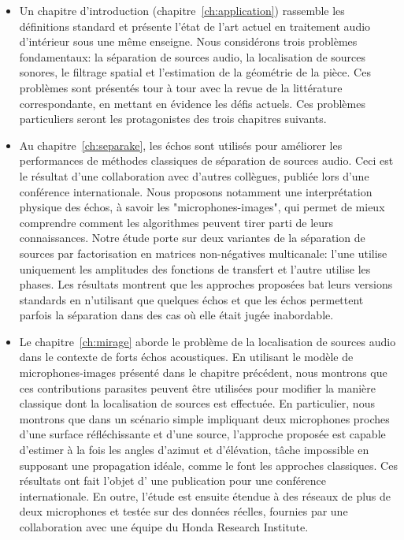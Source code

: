 \begin{itemize}
    \item
    Un chapitre d'introduction (chapitre~\ref{ch:application}) rassemble les définitions standard et présente l'état de l'art actuel en traitement audio d'intérieur sous une même enseigne.
    Nous considérons trois problèmes fondamentaux: la séparation de sources audio, la localisation de sources sonores, le filtrage spatial et l'estimation de la géométrie de la pièce.
    Ces problèmes sont présentés tour à tour avec la revue de la littérature correspondante, en mettant en évidence les défis actuels.
    Ces problèmes particuliers seront les protagonistes des trois chapitres suivants.
    \item
    Au chapitre~\ref{ch:separake}, les échos sont utilisés pour améliorer les performances de méthodes classiques de séparation de sources audio.
    Ceci est le résultat d'une collaboration avec d'autres collègues, publiée lors d'une conférence internationale.
    Nous proposons notamment une interprétation physique des échos, à savoir les "microphones-images", qui permet de mieux comprendre comment les algorithmes peuvent tirer parti de leurs connaissances.
    Notre étude porte sur deux variantes de la séparation de sources par factorisation en matrices non-négatives multicanale:
    l'une utilise uniquement les amplitudes des fonctions de transfert et l'autre utilise les phases.
    Les résultats montrent que les approches proposées bat leurs versions standards en n'utilisant que quelques échos et que les échos permettent parfois la séparation dans des cas où elle était jugée inabordable.
    \item
    Le chapitre~\ref{ch:mirage} aborde le problème de la localisation de sources audio dans le contexte de forts échos acoustiques.
    En utilisant le modèle de microphones-images présenté dans le chapitre précédent, nous montrons que ces contributions parasites peuvent être utilisées pour modifier la manière classique dont la localisation de sources est effectuée.
    En particulier, nous montrons que dans un scénario simple impliquant deux microphones proches d'une surface réfléchissante et d'une source, l'approche proposée est capable d'estimer à la fois les angles d'azimut et d'élévation, tâche impossible en supposant une propagation idéale, comme le font les approches classiques.
    Ces résultats ont fait l'objet d' une publication pour une conférence internationale.
    En outre, l'étude est ensuite étendue à des réseaux de plus de deux microphones et testée sur des données réelles, fournies par une collaboration avec une équipe du Honda Research Institute.

\end{itemize}
